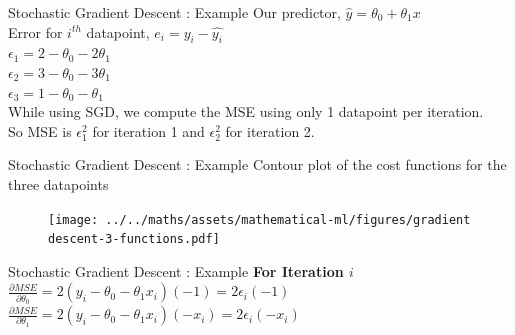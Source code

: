 \documentclass[usenames,dvipsnames]{beamer}
\begin{document}
                        \begin{frame}{Stochastic Gradient Descent : Example}
                        Our predictor, $\hat{y} = \theta_0 + \theta_1x$\\
                        \vspace{1cm}
                        Error for $i^{th}$ datapoint, $e_i = y_i - \hat{y_i}$\\
                        
                        $\epsilon_1 = 2 - \theta_0 - 2\theta_1$ \\
                        $\epsilon_2 = 3 - \theta_0 - 3\theta_1$ \\
                        $\epsilon_3 = 1 - \theta_0 - \theta_1$ \\
                        
                        \vspace{1cm}
                        While using SGD, we compute the MSE using only 1 datapoint per iteration. \\
                        So MSE is $\epsilon_1^2$ for iteration 1 and $\epsilon_2^2$ for iteration 2.
                        \end{frame}

                        \begin{frame}{Stochastic Gradient Descent : Example}
                            Contour plot of the cost functions for the three datapoints
                            \begin{figure}
                                \texttt{[image: ../../maths/assets/mathematical-ml/figures/gradient descent-3-functions.pdf]}
                            \end{figure}
                        \end{frame}
                        
                        
                        \begin{frame}{Stochastic Gradient Descent : Example}
                        \textbf{For Iteration $i$}\\
                        \vspace{1cm}
                        $\frac{\partial MSE}{\partial \theta_0} = 2\left( y_i - \theta_0 -\theta_1x_i \right)\left(-1\right) = 2\epsilon_i\left(-1\right)$ \\
                        \vspace{2cm}
                        $\frac{\partial MSE}{\partial \theta_1} = 2\left( y_i - \theta_0 -\theta_1x_i \right)\left(-x_i\right) = 2\epsilon_i\left(-x_i\right)$ 
                        \end{frame}
                        
\end{document}
